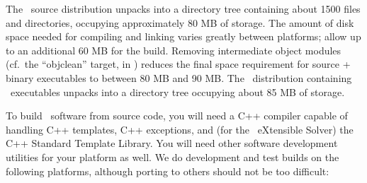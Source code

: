 The \OOMMF\ source distribution unpacks into a directory tree containing
about 1500 files and directories, occupying approximately 80 MB of
storage.  The amount of disk space needed for compiling and linking
varies greatly between platforms; allow up to an additional 60 MB for
the build.  Removing intermediate object modules (cf.\ the 
``objclean'' target, in   ) reduces the final space
requirement for source + binary executables to between 80 MB and 90 MB.
The \OOMMF\ distribution containing \Windows\ executables unpacks into a
directory tree occupying about 85 MB of storage.  

To build \OOMMF\ software from source code, you will
need a C++ compiler capable of handling
C++ templates, C++ exceptions, and (for the \OOMMF\ eXtensible Solver)
the C++ Standard Template Library.  You will need other software
development utilities for your platform as well.  
We do development and
test builds on the following platforms, although porting to others
should not be too difficult:

